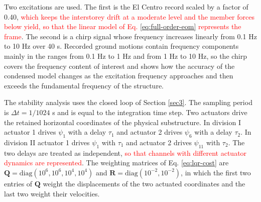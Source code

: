 \documentclass[11pt,a4paper]{article}
\numberwithin{equation}{section}
\newcommand{\rev}[1]{\textcolor{red}{#1}}
\begin{document}
Two excitations are used. The first is the El Centro record scaled by a factor of 0.40, \rev{which keeps the interstorey drift at a moderate level and the member forces below yield, so that the linear model of Eq. \eqref{eq:full-order-eom} represents the frame}. The second is a chirp signal whose frequency increases linearly from 0.1 Hz to 10 Hz over 40 s. Recorded ground motions contain frequency components mainly in the ranges from 0.1 Hz to 1 Hz and from 1 Hz to 10 Hz, so the chirp covers the frequency content of interest and shows how the accuracy of the condensed model changes as the excitation frequency approaches and then exceeds the fundamental frequency of the structure.

The stability analysis uses the closed loop of Section \ref{sec3}. The sampling period is \(\Delta t=1/1024\) s and is equal to the integration time step. Two actuators drive the retained horizontal coordinates of the physical substructure. In division I actuator 1 drives \(\psi_{1}\) with a delay \(\tau_{1}\) and actuator 2 drives \(\psi_{6}\) with a delay \(\tau_{2}\). In division II actuator 1 drives \(\psi_{1}\) with \(\tau_{1}\) and actuator 2 drives \(\psi_{11}\) with \(\tau_{2}\). The two delays are treated as independent, \rev{so that channels with different actuator dynamics are represented}. The weighting matrices of Eq. \eqref{eq:lqr-cost} are \(\mathbf{Q}=\mathrm{diag}(10^{6},10^{6},10^{4},10^{4})\) and \(\mathbf{R}=\mathrm{diag}(10^{-2},10^{-2})\), in which the first two entries of \(\mathbf{Q}\) weight the displacements of the two actuated coordinates and the last two weight their velocities.
\end{document}

